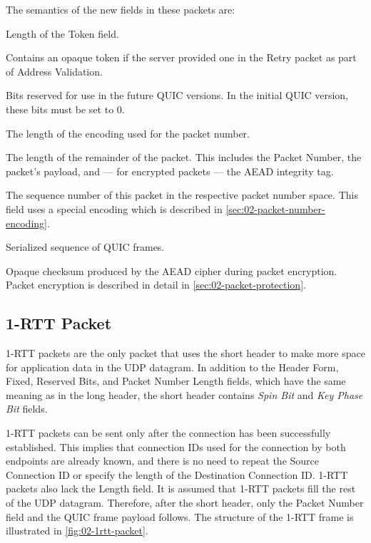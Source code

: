 The semantics of the new fields in these packets are:

\begin{description}

     Length of the Token field.

     Contains an opaque token if the server provided one in
the Retry packet as part of Address Validation.

     Bits reserved for use in the future QUIC versions. In the initial QUIC
version, these bits must be set to 0.

     The length of the encoding used for the packet number.

     The length of the remainder of the packet. This includes the Packet Number, the
packet's payload, and --- for encrypted packets --- the AEAD integrity tag.

     The sequence number of this packet in the respective packet number space.
This field uses a special encoding which is described in \autoref{sec:02-packet-number-encoding}.

     Serialized sequence of QUIC frames.

     Opaque checksum produced by the AEAD cipher during packet encryption.
Packet encryption is described in detail in \autoref{sec:02-packet-protection}.

\end{description}

\subsection{1-RTT Packet}

1-RTT packets are the only packet that uses the short header to make more space for application data
in the UDP datagram. In addition to the Header Form, Fixed, Reserved Bits, and Packet Number Length
fields, which have the same meaning as in the long header, the short header contains \textit{Spin
Bit} and \textit{Key Phase Bit} fields.

1-RTT packets can be sent only after the connection has been successfully established. This implies
that connection IDs used for the connection by both endpoints are already known, and there is no
need to repeat the Source Connection ID or specify the length of the Destination Connection ID.
1-RTT packets also lack the Length field. It is assumed that 1-RTT packets fill the rest of the UDP
datagram. Therefore, after the short header, only the Packet Number field and the QUIC frame payload
follows. The structure of the 1-RTT frame is illustrated in \autoref{fig:02-1rtt-packet}.

